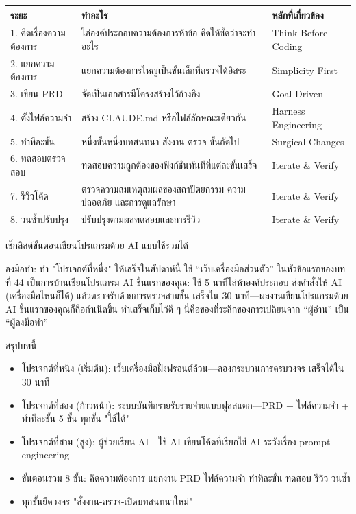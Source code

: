 \begin{center}
\begin{tabularx}{\linewidth}{|X|X|X|}
\hline
\textbf{ระยะ} & \textbf{ทำอะไร} & \textbf{หลักที่เกี่ยวข้อง} \tabularnewline
\hline
1. คิดเรื่องความต้องการ & ไล่องค์ประกอบความต้องการห้าข้อ คิดให้ชัดว่าจะทำอะไร & Think Before Coding \tabularnewline
2. แยกความต้องการ & แยกความต้องการใหญ่เป็นขั้นเล็กที่ตรวจได้อิสระ & Simplicity First \tabularnewline
3. เขียน PRD & จัดเป็นเอกสารมีโครงสร้างไว้อ้างอิง & Goal-Driven \tabularnewline
4. ตั้งไฟล์ความจำ & สร้าง CLAUDE.md หรือไฟล์ลักษณะเดียวกัน & Harness Engineering \tabularnewline
5. ทำทีละขั้น & หนึ่งขั้นหนึ่งบทสนทนา สั่งงาน-ตรวจ-ขั้นถัดไป & Surgical Changes \tabularnewline
6. ทดสอบตรวจสอบ & ทดสอบความถูกต้องของฟังก์ชันทันทีที่แต่ละขั้นเสร็จ & Iterate \& Verify \tabularnewline
7. รีวิวโค้ด & ตรวจความสมเหตุสมผลของสถาปัตยกรรม ความปลอดภัย และการดูแลรักษา & Iterate \& Verify \tabularnewline
8. วนซ้ำปรับปรุง & ปรับปรุงตามผลทดสอบและการรีวิว & Iterate \& Verify \tabularnewline
\hline
\end{tabularx}
\end{center}

\begin{center}\small\color{gray}เช็กลิสต์ขั้นตอนเขียนโปรแกรมด้วย AI แบบใช้ร่วมได้\end{center}

\begin{tcbpractice}{ลงมือทำ: ทำ "โปรเจกต์ที่หนึ่ง" ให้เสร็จในสัปดาห์นี้}
ใช้ “เว็บเครื่องมือส่วนตัว” ในหัวข้อแรกของบทที่ 44 เป็นการบ้านเขียนโปรแกรม AI ชิ้นแรกของคุณ: ใช้ 5 นาทีไล่ห้าองค์ประกอบ ส่งคำสั่งให้ AI (เครื่องมือไหนก็ได้) แล้วตรวจรับด้วยการตรวจสามชั้น เสร็จใน 30 นาที—ผลงานเขียนโปรแกรมด้วย AI ชิ้นแรกของคุณก็ถือกำเนิดขึ้น ทำเสร็จเก็บไว้ดี ๆ นี่คือของที่ระลึกของการเปลี่ยนจาก “ผู้อ่าน” เป็น “ผู้ลงมือทำ”

\end{tcbpractice}

\begin{tcbsummary}{สรุปบทนี้}
\begin{itemize}
  \item โปรเจกต์ที่หนึ่ง (เริ่มต้น): เว็บเครื่องมือฝั่งฟรอนต์ล้วน—ลองกระบวนการครบวงจร เสร็จได้ใน 30 นาที
  \item โปรเจกต์ที่สอง (ก้าวหน้า): ระบบบันทึกรายรับรายจ่ายแบบฟูลสแตก—PRD + ไฟล์ความจำ + ทำทีละขั้น 5 ขั้น ทุกขั้น "ใช้ได้"
  \item โปรเจกต์ที่สาม (สูง): ผู้ช่วยเรียน AI—ใช้ AI เขียนโค้ดที่เรียกใช้ AI ระวังเรื่อง prompt engineering
  \item ขั้นตอนรวม 8 ขั้น: คิดความต้องการ แยกงาน PRD ไฟล์ความจำ ทำทีละขั้น ทดสอบ รีวิว วนซ้ำ
  \item ทุกขั้นยึดวงจร "สั่งงาน-ตรวจ-เปิดบทสนทนาใหม่"
\end{itemize}

\end{tcbsummary}
